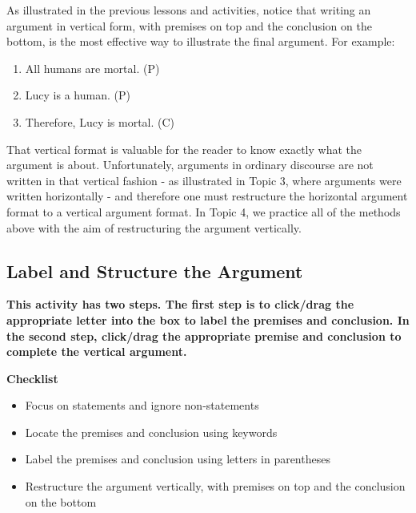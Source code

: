 \documentclass[
]{book}
\providecommand{\tightlist}{%
  \setlength{\itemsep}{0pt}\setlength{\parskip}{0pt}}
\begin{document}
\begin{reflect}
As illustrated in the previous lessons and activities, notice that writing an argument in vertical form, with premises on top and the conclusion on the bottom, is the most effective way to illustrate the final argument. For example:

\begin{enumerate}
\def\labelenumi{\arabic{enumi}.}
\tightlist
\item
  All humans are mortal. (P)
\item
  Lucy is a human. (P)
\item
  Therefore, Lucy is mortal. (C)
\end{enumerate}

That vertical format is valuable for the reader to know exactly what the argument is about. Unfortunately, arguments in ordinary discourse are not written in that vertical fashion - as illustrated in Topic 3, where arguments were written horizontally - and therefore one must restructure the horizontal argument format to a vertical argument format. In Topic 4, we practice all of the methods above with the aim of restructuring the argument vertically.

\hypertarget{label-and-structure-the-argument}{%
\subsection*{Label and Structure the Argument}\label{label-and-structure-the-argument}}

\textbf{This activity has two steps. The first step is to click/drag the appropriate letter into the box to label the premises and conclusion. In the second step, click/drag the appropriate premise and conclusion to complete the vertical argument.}

\textbf{Checklist}

\begin{itemize}
\tightlist
\item
  Focus on statements and ignore non-statements
\item
  Locate the premises and conclusion using keywords
\item
  Label the premises and conclusion using letters in parentheses
\item
  Restructure the argument vertically, with premises on top and the conclusion on the bottom
\end{itemize}


\end{reflect}
\end{document}
